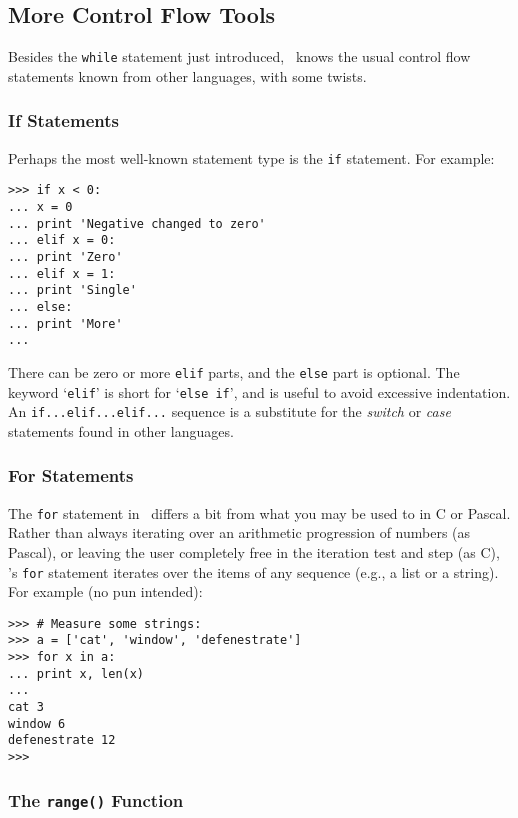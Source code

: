 \subsection{More Control Flow Tools}

Besides the {\tt while} statement just introduced, \Python\ knows the
usual control flow statements known from other languages, with some
twists.

\subsubsection{If Statements}

Perhaps the most well-known statement type is the {\tt if} statement.
For example:
\bcode\begin{verbatim}
>>> if x < 0:
... x = 0
... print 'Negative changed to zero'
... elif x = 0:
... print 'Zero'
... elif x = 1:
... print 'Single'
... else:
... print 'More'
...
\end{verbatim}\ecode
There can be zero or more {\tt elif} parts, and the {\tt else} part is
optional.
The keyword `{\tt elif}' is short for `{\tt else if}', and is useful to
avoid excessive indentation.
An {\tt if...elif...elif...} sequence is a substitute for the
{\em switch} or {\em case} statements found in other languages.

\subsubsection{For Statements}

The {\tt for} statement in \Python\ differs a bit from what you may be
used to in C or Pascal.
Rather than always iterating over an arithmetic progression of numbers
(as Pascal), or leaving the user completely free in the iteration test
and step (as C), \Python's {\tt for} statement iterates over the items
of any sequence (e.g., a list or a string).
For example (no pun intended):
\bcode\begin{verbatim}
>>> # Measure some strings:
>>> a = ['cat', 'window', 'defenestrate']
>>> for x in a:
... print x, len(x)
...
cat 3
window 6
defenestrate 12
>>>
\end{verbatim}\ecode

\subsubsection{The {\tt range()} Function}

